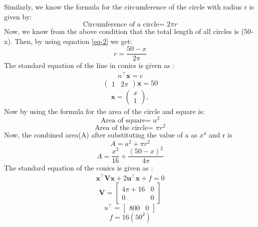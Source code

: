 \documentclass[journal,12pt,twocolumn]{IEEEtran}
\let\vec\mathbf
\newcommand{\myvec}[1]{\ensuremath{\begin{pmatrix}#1\end{pmatrix}}}
\begin{document}
Similarly, we know the formula for the circumference of the circle with radius r is given by:
\begin{equation}
\text{Circumference of a circle= }2\pi r
\label{eq-2}
\end{equation} 
Now, we know from the above condition that the total length of all circles is (50-x).
Then, by using equation \ref{eq-2} we get:
\begin{equation}
r=\frac{50-x}{2\pi}
\end{equation}
The standard equation of the line in conics is given as :
\begin{align}
n^\top \vec{x} = c
\end{align}
\begin{equation}
\begin{pmatrix}1 & 2\pi\end{pmatrix}  \vec{x} = 50
\end{equation}
\begin{align}
\vec{x}  = \myvec{x\\1},
\end{align}
Now by using the formula for the area of the circle and square is:
\begin{equation}
\text{Area of square= }a^2
\end{equation}
\begin{equation}
\text{Area of the circle= }\pi r^2
\end{equation}
Now, the combined area(A) after substituting the value of a as $x^4$ and r is
\begin{equation}
A=a^2+\pi r^2
\end{equation}
\begin{equation}
A = \frac{x^2}{16} + \frac{(50-x)^2}{4\pi}
\end{equation}
The standard equation of the conics is given as :
\begin{align}
\vec{x}^{\top}\vec{V}\vec{x}+2\vec{u}^{\top}\vec{x}+f=0
\end{align}
\begin{equation}
\vec{V} = \begin{bmatrix}
4\pi+16 & 0 \\
0 & 0
\end{bmatrix}
\end{equation}
\begin{equation}
u^\top = \begin{bmatrix}
800 & 0
\end{bmatrix}
\end{equation}
\begin{equation}
f = 16(50^2)
\end{equation}
\end{document}
